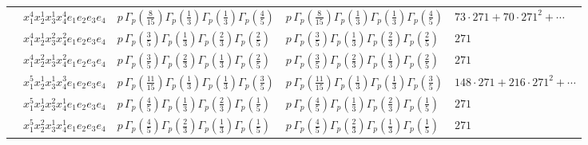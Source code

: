 \documentclass[11pt]{article}
\begin{document}
\begin{table}[ht]
{\begin{tabular}{@{}lllll@{}}
 & $x_{1}^{4} x_{2}^{1} x_{3}^{1} x_{4}^{4}  e_{1} e_{2} e_{3} e_{4}$ & $p \, \Gamma_p \left( \frac{8}{15} \right) \Gamma_p \left( \frac{1}{3} \right) \Gamma_p \left( \frac{1}{3} \right) \Gamma_p \left( \frac{4}{5} \right)$ & $p \, \Gamma_p \left( \frac{8}{15} \right) \Gamma_p \left( \frac{1}{3} \right) \Gamma_p \left( \frac{1}{3} \right) \Gamma_p \left( \frac{4}{5} \right)$ & $73{\cdot}271{+}70{\cdot}271^{2}{+}\cdots$ \\
 & $x_{1}^{4} x_{2}^{1} x_{3}^{2} x_{4}^{2}  e_{1} e_{2} e_{3} e_{4}$ & $p \, \Gamma_p \left( \frac{3}{5} \right) \Gamma_p \left( \frac{1}{3} \right) \Gamma_p \left( \frac{2}{3} \right) \Gamma_p \left( \frac{2}{5} \right)$ & $p \, \Gamma_p \left( \frac{3}{5} \right) \Gamma_p \left( \frac{1}{3} \right) \Gamma_p \left( \frac{2}{3} \right) \Gamma_p \left( \frac{2}{5} \right)$ & $271$ \\
 & $x_{1}^{4} x_{2}^{2} x_{3}^{1} x_{4}^{2}  e_{1} e_{2} e_{3} e_{4}$ & $p \, \Gamma_p \left( \frac{3}{5} \right) \Gamma_p \left( \frac{2}{3} \right) \Gamma_p \left( \frac{1}{3} \right) \Gamma_p \left( \frac{2}{5} \right)$ & $p \, \Gamma_p \left( \frac{3}{5} \right) \Gamma_p \left( \frac{2}{3} \right) \Gamma_p \left( \frac{1}{3} \right) \Gamma_p \left( \frac{2}{5} \right)$ & $271$ \\
 & $x_{1}^{5} x_{2}^{1} x_{3}^{1} x_{4}^{3}  e_{1} e_{2} e_{3} e_{4}$ & $p \, \Gamma_p \left( \frac{11}{15} \right) \Gamma_p \left( \frac{1}{3} \right) \Gamma_p \left( \frac{1}{3} \right) \Gamma_p \left( \frac{3}{5} \right)$ & $p \, \Gamma_p \left( \frac{11}{15} \right) \Gamma_p \left( \frac{1}{3} \right) \Gamma_p \left( \frac{1}{3} \right) \Gamma_p \left( \frac{3}{5} \right)$ & $148{\cdot}271{+}216{\cdot}271^{2}{+}\cdots$ \\
 & $x_{1}^{5} x_{2}^{1} x_{3}^{2} x_{4}^{1}  e_{1} e_{2} e_{3} e_{4}$ & $p \, \Gamma_p \left( \frac{4}{5} \right) \Gamma_p \left( \frac{1}{3} \right) \Gamma_p \left( \frac{2}{3} \right) \Gamma_p \left( \frac{1}{5} \right)$ & $p \, \Gamma_p \left( \frac{4}{5} \right) \Gamma_p \left( \frac{1}{3} \right) \Gamma_p \left( \frac{2}{3} \right) \Gamma_p \left( \frac{1}{5} \right)$ & $271$ \\
 & $x_{1}^{5} x_{2}^{2} x_{3}^{1} x_{4}^{1}  e_{1} e_{2} e_{3} e_{4}$ & $p \, \Gamma_p \left( \frac{4}{5} \right) \Gamma_p \left( \frac{2}{3} \right) \Gamma_p \left( \frac{1}{3} \right) \Gamma_p \left( \frac{1}{5} \right)$ & $p \, \Gamma_p \left( \frac{4}{5} \right) \Gamma_p \left( \frac{2}{3} \right) \Gamma_p \left( \frac{1}{3} \right) \Gamma_p \left( \frac{1}{5} \right)$ & $271$ \\

\end{tabular}}
\end{table}
\end{document}

